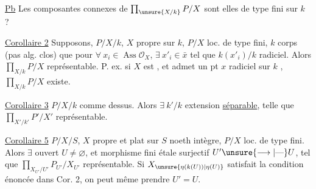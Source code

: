 \uline{Pb} Les composantes connexes de $\prod_{\unsure{X/k}}P/X$ sont elles de type fini sur $k$ ?

\uline{Corollaire 2} Supposons,    $P/X/k$, $X$ propre sur $k$, $P/X$ loc. de type fini, $k$ corps (pas   alg. clos) que \deleted{$\forall$} pour $\forall\ x_i\in\operatorname{Ass}\mathcal O_X$, $\exists\ x'_i\in\bar x$ tel que $k(x'_i)/k$ radiciel.  Alors $\prod_{X/k}P/X$ représentable.
P. ex. si $X$  est  , et admet un pt $x$ radiciel sur $k$ , $\prod_{X/k}P/X$ existe.

\uline{Corollaire 3} $P/X/k$ comme dessus. Alors $\exists\ k'/k$ extension  \uline{séparable}, telle que $\prod_{X'/k'}P'/X'$ représentable.


\uline{Corollaire 5} $P/X/S$, $X$ propre et plat sur $S$ noeth intègre, $P/X$ loc. de type fini. Alors $\exists$  ouvert $U\ne\varnothing$, et morphisme fini étale surjectif $U'\unsure{\longrightarrow|\text{—}}U$, tel que $\prod_{X_{U'}/U'}P_{U'}/X_{U'}$ représentable. Si $X_{\unsure{\eta(k(U))|\eta(U)}}$ satisfait la condition énoncée dans Cor. 2, on peut même prendre $U'=U$.

